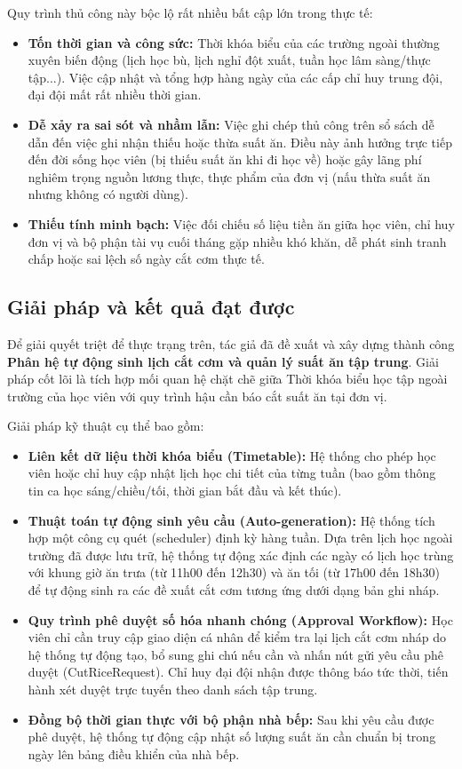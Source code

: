 \documentclass[../DoAn.tex]{subfiles}
\begin{document}
Quy trình thủ công này bộc lộ rất nhiều bất cập lớn trong thực tế:
\begin{itemize}
    \item \textbf{Tốn thời gian và công sức:} Thời khóa biểu của các trường ngoài thường xuyên biến động (lịch học bù, lịch nghỉ đột xuất, tuần học lâm sàng/thực tập...). Việc cập nhật và tổng hợp hàng ngày của các cấp chỉ huy trung đội, đại đội mất rất nhiều thời gian.
    \item \textbf{Dễ xảy ra sai sót và nhầm lẫn:} Việc ghi chép thủ công trên sổ sách dễ dẫn đến việc ghi nhận thiếu hoặc thừa suất ăn. Điều này ảnh hưởng trực tiếp đến đời sống học viên (bị thiếu suất ăn khi đi học về) hoặc gây lãng phí nghiêm trọng nguồn lương thực, thực phẩm của đơn vị (nấu thừa suất ăn nhưng không có người dùng).
    \item \textbf{Thiếu tính minh bạch:} Việc đối chiếu số liệu tiền ăn giữa học viên, chỉ huy đơn vị và bộ phận tài vụ cuối tháng gặp nhiều khó khăn, dễ phát sinh tranh chấp hoặc sai lệch số ngày cắt cơm thực tế.
\end{itemize}

\subsection{Giải pháp và kết quả đạt được}
\label{subsection:5.1.2}
Để giải quyết triệt để thực trạng trên, tác giả đã đề xuất và xây dựng thành công \textbf{Phân hệ tự động sinh lịch cắt cơm và quản lý suất ăn tập trung}. Giải pháp cốt lõi là tích hợp mối quan hệ chặt chẽ giữa Thời khóa biểu học tập ngoài trường của học viên với quy trình hậu cần báo cắt suất ăn tại đơn vị.

Giải pháp kỹ thuật cụ thể bao gồm:
\begin{itemize}
    \item \textbf{Liên kết dữ liệu thời khóa biểu (Timetable):} Hệ thống cho phép học viên hoặc chỉ huy cập nhật lịch học chi tiết của từng tuần (bao gồm thông tin ca học sáng/chiều/tối, thời gian bắt đầu và kết thúc).
    \item \textbf{Thuật toán tự động sinh yêu cầu (Auto-generation):} Hệ thống tích hợp một công cụ quét (scheduler) định kỳ hàng tuần. Dựa trên lịch học ngoài trường đã được lưu trữ, hệ thống tự động xác định các ngày có lịch học trùng với khung giờ ăn trưa (từ 11h00 đến 12h30) và ăn tối (từ 17h00 đến 18h30) để tự động sinh ra các đề xuất cắt cơm tương ứng dưới dạng bản ghi nháp.
    \item \textbf{Quy trình phê duyệt số hóa nhanh chóng (Approval Workflow):} Học viên chỉ cần truy cập giao diện cá nhân để kiểm tra lại lịch cắt cơm nháp do hệ thống tự động tạo, bổ sung ghi chú nếu cần và nhấn nút gửi yêu cầu phê duyệt (CutRiceRequest). Chỉ huy đại đội nhận được thông báo tức thời, tiến hành xét duyệt trực tuyến theo danh sách tập trung.
    \item \textbf{Đồng bộ thời gian thực với bộ phận nhà bếp:} Sau khi yêu cầu được phê duyệt, hệ thống tự động cập nhật số lượng suất ăn cần chuẩn bị trong ngày lên bảng điều khiển của nhà bếp.
\end{itemize}
\end{document}
